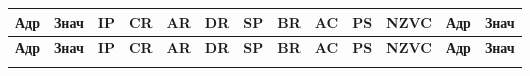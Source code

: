 \documentclass[14pt,final,oneside]{extreport}%
\begin{document}
{\footnotesize{\begin{longtable}{|>{\centering\arraybackslash}p{0.9cm}|>{\centering\arraybackslash}p{0.9cm}|>{\centering\arraybackslash}p{0.7cm}|>{\centering\arraybackslash}p{0.7cm}|>{\centering\arraybackslash}p{0.7cm}|>{\centering\arraybackslash}p{0.7cm}|>{\centering\arraybackslash}p{0.7cm}|>{\centering\arraybackslash}p{0.8cm}|>{\centering\arraybackslash}p{0.8cm}|>{\centering\arraybackslash}p{0.6cm}|>{\centering\arraybackslash}p{1.0cm}|>{\centering\arraybackslash}p{0.9cm}|>{\centering\arraybackslash}p{0.9cm}|}
\hline
\textbf{Адр} & \textbf{Знач} & \textbf{IP} & \textbf{CR} & \textbf{AR} & \textbf{DR} & \textbf{SP} & \textbf{BR} & \textbf{AC} & \textbf{PS} & \textbf{NZVC} & \textbf{Адр} & \textbf{Знач} \\
\hline
\endfirsthead

\hline
\textbf{Адр} & \textbf{Знач} & \textbf{IP} & \textbf{CR} & \textbf{AR} & \textbf{DR} & \textbf{SP} & \textbf{BR} & \textbf{AC} & \textbf{PS} & \textbf{NZVC} & \textbf{Адр} & \textbf{Знач} \\
\hline
\endhead

\endfoot

\hline
\endlastfoot


\end{longtable}}}
\end{document}
